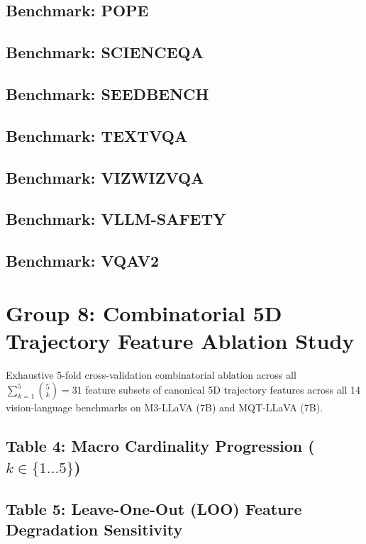 \documentclass[11pt,a4paper]{article}
\begin{document}
\subsection{Benchmark: POPE}

\clearpage
\subsection{Benchmark: SCIENCEQA}

\clearpage
\subsection{Benchmark: SEEDBENCH}

\clearpage
\subsection{Benchmark: TEXTVQA}

\clearpage
\subsection{Benchmark: VIZWIZVQA}

\clearpage
\subsection{Benchmark: VLLM-SAFETY}

\clearpage
\subsection{Benchmark: VQAV2}

\clearpage
\section{Group 8: Combinatorial 5D Trajectory Feature Ablation Study}
Exhaustive 5-fold cross-validation combinatorial ablation across all $\sum_{k=1}^5 \binom{5}{k} = 31$ feature subsets of canonical 5D trajectory features across all 14 vision-language benchmarks on M3-LLaVA (7B) and MQT-LLaVA (7B).
\subsection{Table 4: Macro Cardinality Progression ($k \in \{1 \dots 5\}$)}

\clearpage
\subsection{Table 5: Leave-One-Out (LOO) Feature Degradation Sensitivity}

\clearpage
\end{document}
